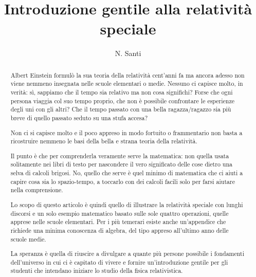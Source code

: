 \documentclass[pdftex,a4paper, 12pt, article, column, 
openany,extrafontsizes]{memoir}
\author{N. Santi}
\title{Introduzione gentile alla relatività speciale}
\begin{document}
\frontmatter

\maketitle

\begin{abstract}
Albert Einstein formulò la sua teoria della relatività cent'anni fa ma ancora 
adesso non viene nemmeno insegnata nelle scuole elementari o medie. Nessuno ci 
capisce molto, in verità: sì, sappiamo che il tempo sia relativo ma non cosa 
significhi? Forse che ogni persona viaggia col suo tempo proprio, che non è 
possibile confrontare le esperienze degli uni con gli altri? Che il tempo 
passato con una bella ragazza/ragazzo sia più breve di quello passato seduto su 
una stufa accesa?

Non ci si capisce molto e il poco appreso in modo fortuito o frammentario non 
basta a ricostruire nemmeno le basi della bella e strana teoria della 
relatività.

Il punto è che per comprenderla veramente serve la matematica: non quella usata 
solitamente nei libri di testo per nascondere il vero significato delle cose 
dietro una selva di calcoli brigosi. No, quello che serve è quel minimo di 
matematica che ci aiuti a capire cosa sia lo spazio-tempo, a toccarlo con dei 
calcoli facili solo per farsi aiutare nella comprensione.

Lo scopo di questo articolo è quindi quello di illustrare la relatività speciale 
con lunghi discorsi e un solo esempio matematico basato sulle sole quattro 
operazioni, quelle apprese nelle scuole elementari. Per i più temerari esiste 
anche un'appendice che richiede una minima conoscenza di algebra, del tipo 
appreso all'ultimo anno delle scuole medie.

La speranza è quella di riuscire a divulgare a quante più persone possibile i 
fondamenti dell'universo in cui ci è capitato di vivere e fornire 
un'introduzione gentile per gli studenti che intendano iniziare lo studio della 
fisica relativistica.

\end{abstract}

\clearpage

\tableofcontents*
\clearpage
\frontmatter




\backmatter



% 
% 
\end{document}
